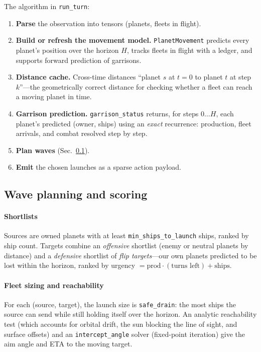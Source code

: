 \documentclass[conference]{IEEEtran}
\begin{document}
The algorithm in \texttt{run\_turn}:
\begin{enumerate}
\item \textbf{Parse} the observation into tensors (planets, fleets in flight).
\item \textbf{Build or refresh the movement model.} \texttt{PlanetMovement} predicts every planet's position over the horizon $H$, tracks fleets in flight with a ledger, and supports forward prediction of garrisons.
\item \textbf{Distance cache.} Cross-time distances ``planet $s$ at $t{=}0$ to planet $t$ at step $k$''---the geometrically correct distance for checking whether a fleet can reach a moving planet in time.
\item \textbf{Garrison prediction.} \texttt{garrison\_status} returns, for steps $0\ldots H$, each planet's predicted (owner, ships) using an \emph{exact} recurrence: production, fleet arrivals, and combat resolved step by step.
\item \textbf{Plan waves} (Sec.~\ref{sec:waves}).
\item \textbf{Emit} the chosen launches as a sparse action payload.
\end{enumerate}

\subsection{Wave planning and scoring}
\label{sec:waves}

\paragraph{Shortlists} Sources are owned planets with at least \texttt{min\_ships\_to\_launch} ships, ranked by ship count. Targets combine an \emph{offensive} shortlist (enemy or neutral planets by distance) and a \emph{defensive} shortlist of \textit{flip targets}---our own planets predicted to be lost within the horizon, ranked by urgency $=\text{prod}\cdot(\text{turns left}) + \text{ships}$.

\paragraph{Fleet sizing and reachability} For each (source, target), the launch size is \texttt{safe\_drain}: the most ships the source can send while still holding itself over the horizon. An analytic reachability test (which accounts for orbital drift, the sun blocking the line of sight, and surface offsets) and an \texttt{intercept\_angle} solver (fixed-point iteration) give the aim angle and ETA to the moving target.
\end{document}
